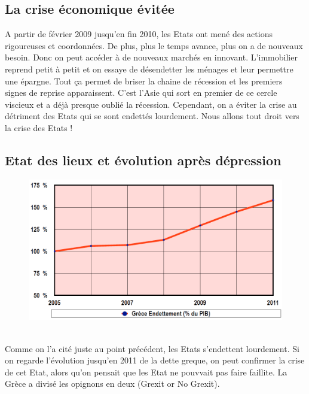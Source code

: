 \subsection{La crise économique évitée}
A partir de février 2009 jusqu'en fin 2010, les Etats ont mené des actions rigoureuses et coordonnées. De plus, plus le temps avance, plus on a de nouveaux besoin. Donc on peut accéder à de nouveaux marchés en innovant. L'immobilier reprend petit à petit et on essaye de désendetter les ménages et leur permettre une épargne. Tout ça permet de briser la chaine de récession et les premiers signes de reprise apparaissent. C'est l'Asie qui sort en premier de ce cercle viscieux et a déjà presque oublié la récession. Cependant, on a éviter la crise au détriment des Etats qui se sont endettés lourdement. Nous allons tout droit vers la crise des Etats !

\subsection{Etat des lieux et évolution après dépression}
\begin{figure}
\includegraphics[scale=0.28]{24}
\end{figure}
\ \\ Comme on l'a cité juste au point précédent, les Etats s'endettent lourdement. Si on regarde l'évolution jusqu'en 2011 de la dette greque, on peut confirmer la crise de cet Etat, alors qu'on pensait que les Etat ne pouvvait pas faire faillite. La Grèce a divisé les opignons en deux (Grexit or No Grexit). 

